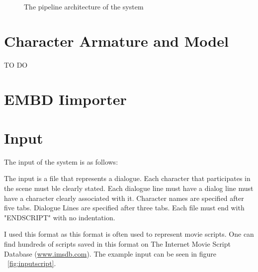 \begin{figure}[!ht]
\centerline{}
\caption{The pipeline architecture of the system}\label{fig:architecture}
\end{figure}

\section{Character Armature and Model}

TO DO

\section{EMBD Iimporter}

\section{Input}

The input of the system is as follows:

The input is a file that represents a dialogue. Each character that participates in the scene must ble clearly stated. Each dialogue line must have a dialog line must have a character clearly associated with it. Character names are specified after five tabs. Dialogue Lines are specified after three tabs. Each file must end with "ENDSCRIPT" with no indentation.

I used this format as this format is often used to represent movie scripts. One can find hundreds of scripts saved in this format on The Internet Movie Script Database (\url{www.imsdb.com}). The example input can be seen in figure ~\ref{fig:inputscript}.


